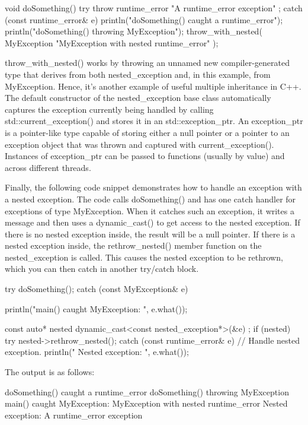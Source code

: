\begin{cpp}
void doSomething()
{
    try {
        throw runtime_error { "A runtime_error exception" };
    } catch (const runtime_error& e) {
        println("doSomething() caught a runtime_error");
        println("doSomething() throwing MyException");
        throw_with_nested(
            MyException { "MyException with nested runtime_error" });
    }
}
\end{cpp}

throw\_with\_nested() works by throwing an unnamed new compiler-generated type that derives from both nested\_exception and, in this example, from MyException. Hence, it’s another example of useful multiple inheritance in C++. The default constructor of the nested\_exception base class automatically captures the exception currently being handled by calling std::current\_exception() and stores it in an std::exception\_ptr. An exception\_ptr is a pointer-like type capable of storing either a null pointer or a pointer to an exception object that was thrown and captured with current\_exception(). Instances of exception\_ptr can be passed to functions (usually by value) and across different threads.

Finally, the following code snippet demonstrates how to handle an exception with a nested exception. The code calls doSomething() and has one catch handler for exceptions of type MyException. When it catches such an exception, it writes a message and then uses a dynamic\_cast() to get access to the nested exception. If there is no nested exception inside, the result will be a null pointer. If there is a nested exception inside, the rethrow\_nested() member function on the nested\_exception is called. This causes the nested exception to be rethrown, which you can then catch in another try/catch block.

\begin{cpp}
try {
    doSomething();
} catch (const MyException& e) {
    println("main() caught MyException: {}", e.what());

    const auto* nested { dynamic_cast<const nested_exception*>(&e) };
    if (nested) {
        try {
            nested->rethrow_nested();
        } catch (const runtime_error& e) {
            // Handle nested exception.
            println(" Nested exception: {}", e.what());
        }
    }
}
\end{cpp}

The output is as follows:

\begin{shell}
doSomething() caught a runtime_error
doSomething() throwing MyException
main() caught MyException: MyException with nested runtime_error
  Nested exception: A runtime_error exception
\end{shell}


